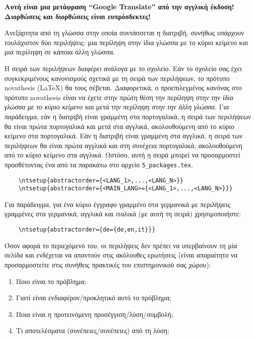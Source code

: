 
%

\textbf{Αυτή είναι μια μετάφραση “Google Translate” από την αγγλική έκδοση! Διορθώσεις και διορθώσεις είναι ευπρόσδεκτες!}

Ανεξάρτητα από τη γλώσσα στην οποία συντάσσεται η διατριβή, συνήθως υπάρχουν τουλάχιστον δύο περιλήψεις: μια περίληψη στην ίδια γλώσσα με το κύριο κείμενο και μια περίληψη σε κάποια άλλη γλώσσα.

Η σειρά των περιλήψεων διαφέρει ανάλογα με το σχολείο. Εάν το σχολείο σας έχει συγκεκριμένους κανονισμούς σχετικά με τη σειρά των περιλήψεων, το πρότυπο \gls{novathesis} (\LaTeX) θα τους σέβεται. Διαφορετικά, ο προεπιλεγμένος κανόνας στο πρότυπο \gls{novathesis} είναι να έχετε στην πρώτη θέση την περίληψη στην \emph{την ίδια γλώσσα με το κύριο κείμενο} και μετά την περίληψη στην \emph{την άλλη γλώσσα}. Για παράδειγμα, εάν η διατριβή είναι γραμμένη στα πορτογαλικά, η σειρά των περιλήψεων θα είναι πρώτα πορτογαλικά και μετά στα αγγλικά, ακολουθούμενη από το κύριο κείμενο στα πορτογαλικά. Εάν η διατριβή είναι γραμμένη στα αγγλικά, η σειρά των περιλήψεων θα είναι πρώτα αγγλικά και στη συνέχεια πορτογαλικά, ακολουθούμενη από το κύριο κείμενο στα αγγλικά.
%
Ωστόσο, αυτή η σειρά μπορεί να προσαρμοστεί προσθέτοντας ένα από τα παρακάτω στο αρχείο \verb+5_packages.tex+.

\begin{verbatim}
    \ntsetup{abstractorder={<LANG_1>,...,<LANG_N>}}
    \ntsetup{abstractorder={<MAIN_LANG>={<LANG_1>,...,<LANG_N>}}}
\end{verbatim}

Για παράδειγμα, για ένα κύριο έγγραφο γραμμένο στα γερμανικά με περιλήψεις γραμμένες στα γερμανικά, αγγλικά και ιταλικά (με αυτή τη σειρά) χρησιμοποιήστε:
\begin{verbatim}
    \ntsetup{abstractorder={de={de,en,it}}}
\end{verbatim}

Όσον αφορά το περιεχόμενό του, οι περιλήψεις δεν πρέπει να υπερβαίνουν τη μία σελίδα και ενδέχεται να απαντούν στις ακόλουθες ερωτήσεις (είναι απαραίτητο να προσαρμοστείτε στις συνήθεις πρακτικές του επιστημονικού σας χώρου):

\begin{enumerate}
  \item Ποιο είναι το πρόβλημα;
  \item Γιατί είναι ενδιαφέρον/προκλητικό αυτό το πρόβλημα;
  \item Ποια είναι η προτεινόμενη προσέγγιση/λύση/συμβολή;
  \item Τι αποτελέσματα (συνέπειες/συνέπειες) από τη λύση;
\end{enumerate}


